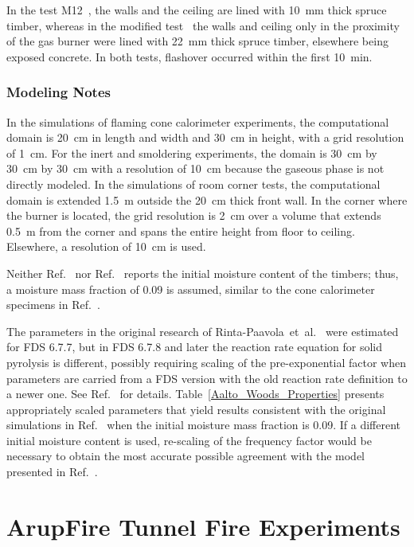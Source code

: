 In the test M12~\cite{Sundstrom:1998}, the walls and the ceiling are lined with 10~mm thick spruce timber, whereas in the modified test~\cite{Hietaniemi:2001} the walls and ceiling only in the proximity of the gas burner were lined with 22~mm thick spruce timber, elsewhere being exposed concrete. In both tests, flashover occurred within the first 10~min.

\subsubsection{Modeling Notes}

In the simulations of flaming cone calorimeter experiments, the computational domain is 20~cm in length and width and 30~cm in height, with a grid resolution of 1~cm. For the inert and smoldering experiments, the domain is 30~cm by 30~cm by 30~cm with a resolution of 10~cm because the gaseous phase is not directly modeled. In the simulations of room corner tests, the computational domain is extended 1.5~m outside the 20~cm thick front wall. In the corner where the burner is located, the grid resolution is 2~cm over a volume that extends 0.5~m from the corner and spans the entire height from floor to ceiling. Elsewhere, a resolution of 10~cm is used.

Neither Ref.~\cite{Sundstrom:1998} nor Ref.~\cite{Hietaniemi:2001} reports the initial moisture content of the timbers; thus, a moisture mass fraction of 0.09 is assumed, similar to the cone calorimeter specimens in Ref.~\cite{Rinta-Paavola:2023}.

The parameters in the original research of Rinta-Paavola~et~al.~\cite{Rinta-Paavola:2023} were estimated for FDS 6.7.7, but in FDS 6.7.8 and later the reaction rate equation for solid pyrolysis is different, possibly requiring scaling of the pre-exponential factor when parameters are carried from a FDS version with the old reaction rate definition to a newer one. See Ref.~\cite{Rinta-Paavola:2023} for details. Table~\ref{Aalto_Woods_Properties} presents appropriately scaled parameters that yield results consistent with the original simulations in Ref.~\cite{Rinta-Paavola:2023} when the initial moisture mass fraction is 0.09. If a different initial moisture content is used, re-scaling of the frequency factor would be necessary to obtain the most accurate possible agreement with the model presented in Ref.~\cite{Rinta-Paavola:2023}.


\section{ArupFire Tunnel Fire Experiments}
\label{ArupFire_Tunnel_Fire_Description}

